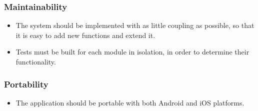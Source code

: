 \subsubsection{Maintainability}
\begin{itemize}
    \item The system should be implemented with as little coupling as possible, so that it is easy to add new functions and extend it.
    \item Tests must be built for each module in isolation, in order to determine their functionality. 
\end{itemize}
\subsubsection{Portability}
    \begin{itemize}
        \item The application should be portable with both Android and iOS platforms.
    \end{itemize}         

